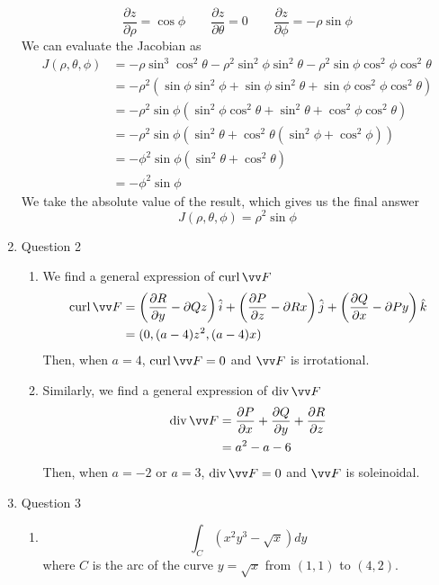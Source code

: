 \documentclass[11pt]{article}
\def\Div {\mathrm{div\,}}
\def\Curl {\mathrm{curl\,}}
\newcommand{\partialderiv}[2] {\frac{\partial #1}{\partial #2}}
\begin{document}
\begin{enumerate}
$$    $$
    $$
    \partialderiv{z}{\rho} = \cos\phi \qquad
    \partialderiv{z}{\theta} = 0 \qquad
    \partialderiv{z}{\phi} = -\rho\sin\phi
    $$
    We can evaluate the Jacobian as
    $$
    \begin{aligned}
    J(\rho,\theta,\phi) &= -\rho \sin^3\cos^2\theta - \rho^2\sin^2\phi\sin^2\theta - \rho^2 \sin\phi \cos^2\phi \cos^2\theta \\
    &= -\rho^2 (\sin\phi\sin^2\phi + \sin\phi\sin^2\theta + \sin\phi\cos^2\phi\cos^2\theta) \\
    &= -\rho^2\sin\phi(\sin^2\phi\cos^2\theta + \sin^2\theta + \cos^2\phi\cos^2\theta) \\
    &= -\rho^2\sin\phi (\sin^2\theta + \cos^2\theta ( \sin^2\phi + \cos^2\phi)) \\
    &= -\phi^2\sin\phi (\sin^2 \theta + \cos^2 \theta) \\
    &= -\phi^2\sin\phi
    \end{aligned}
    $$
    We take the absolute value of the result, which gives us the final answer
    $$
    J(\rho,\theta,\phi) = \rho^2\sin\phi
    $$
    
    \item Question 2
    \begin{enumerate}
        \item We find a general expression of $\Curl \vv F$
        $$
        \begin{aligned}
        \Curl \vv F &= \left( \partialderiv{R}{y} - \partial{Q}{z} \right) \hat{i} + \left( \partialderiv{P}{z} - \partial{R}{x} \right) \hat{j} + \left( \partialderiv{Q}{x} - \partial{P}{y} \right) \hat{k} \\
        &= (0, (a-4)z^2, (a-4)x)
        \end{aligned}
        $$
        Then, when $a=4$, $\Curl \vv F = 0$ and $\vv F$ is irrotational.
        
        \item Similarly, we find a general expression of $\Div \vv F$
        $$
        \begin{aligned}
        \Div \vv F &= \partialderiv{P}{x} + \partialderiv{Q}{y} + \partialderiv{R}{z} \\
        &= a^2 - a -6
        \end{aligned}
        $$
        Then, when $a=-2$ or $a=3$, $\Div \vv F = 0$ and $\vv F$ is soleinoidal.
    \end{enumerate}
    
    \item Question 3
    \begin{enumerate}
        \item 
        $$
        \int_C (x^2y^3 - \sqrt{x})dy
        $$
        where $C$ is the arc of the curve $y=\sqrt{x}$ from $(1,1)$ to $(4,2)$.
        

\end{enumerate}
\end{enumerate}
\end{document}
